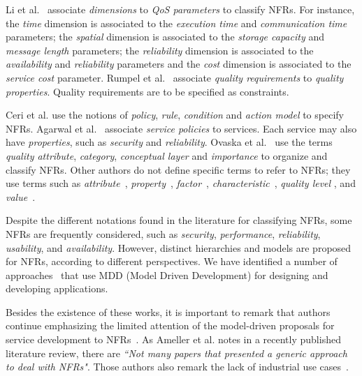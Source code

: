 \documentclass{singlecol-new}
\theoremstyle{TH}{
\newtheorem{lemma}{Lemma}
\newtheorem{theorem}[lemma]{Theorem}
\newtheorem{corrolary}[lemma]{Corrolary}
\newtheorem{conjecture}[lemma]{Conjecture}
\newtheorem{proposition}[lemma]{Proposition}
\newtheorem{claim}[lemma]{Claim}
\newtheorem{stheorem}[lemma]{Wrong Theorem}
\newtheorem{algorithm}{Algorithm}
}
\theoremstyle{THrm}{
\newtheorem{definition}{Definition}[section]
\newtheorem{question}{Question}[section]
\newtheorem{remark}{Remark}
\newtheorem{scheme}{Scheme}
}
\theoremstyle{THhit}{
\newtheorem{case}{Case}[section]
}
\theoremstyle{THhsl}{
\newtheorem{example}{Example}
}
\begin{document}
Li et al.~\cite{Li2013} associate \textit{dimensions} to  \textit{QoS parameters} to classify NFRs.
For instance, the \textit{time} dimension is associated to the \textit{execution time} and \textit{communication time} parameters; the \textit{spatial} dimension is associated to the \textit{storage capacity} and \textit{message length} parameters; the \textit{reliability} dimension is associated to the \textit{availability} and \textit{reliability} parameters and the \textit{cost} dimension is associated to the \textit{service cost} parameter.
Rumpel et al.~\cite{Rumpel2012}  associate \textit{quality requirements} to  \textit{quality properties}. Quality requirements are to be specified as constraints.

Ceri et al.\cite{CeriDMF07} use the notions of \textit{policy}, \textit{rule}, \textit{condition} and \textit{action model} to specify NFRs.
Agarwal et al.~\cite{AgarwalLS09} associate \textit{service policies} to services.
Each service may also have \textit{properties}, such as \textit{security} and \textit{reliability}.
Ovaska et al.~\cite{OvaskaEHPA10} use the terms \textit{quality attribute}, \textit{category}, \textit{conceptual layer} and \textit{importance} to organize and classify NFRs.
Other authors do not define specific terms to refer to NFRs; they use terms such as \textit{attribute}~\cite{ZhangPSP05,BasinDL06,JeongCL09},
\textit{property}~\cite{Fabra2011},
\textit{factor}~\cite{MohantyRP10,GutierrezRF10},
\textit{characteristic}~\cite{DiamadopoulouMPS08},
\textit{qual\-i\-ty level} \cite{ModicaTV09}, and
\textit{value}~\cite{ThissenW06,BasinDL06}.


Despite the different notations found in the literature for classifying NFRs, some NFRs are frequently considered, such as \textit{security}, \textit{performance}, \textit{reliability}, \textit{usability}, and \textit{availability}.
However, distinct hierarchies and models are proposed for NFRs, according to different perspectives.
We have identified a number of approaches~\cite{DAmbrogio06,CholletL09,SchmelingCM11,BasinDL06,Fabra2011,OvaskaEHPA10} that use MDD (Model Driven Development) for designing and developing applications.

Besides the existence of these works, it is important to remark that authors continue emphasizing the limited attention of the model-driven proposals for service development to NFRs~\cite{Ameller201542,Ameller2010}.%
As Ameller et al. notes in a recently published literature review, there are \textit{``Not many papers that presented a generic approach to deal with NFRs"}. Those authors also remark the lack of industrial use cases~\cite{Ameller201542}. 
\end{document}
